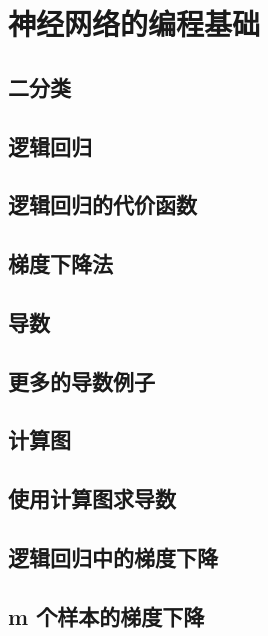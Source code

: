 \documentclass[../../main.tex]{subfiles}
\begin{document}
\chapter{神经网络的编程基础}
\section{二分类}

\section{逻辑回归}

\section{逻辑回归的代价函数}

\section{梯度下降法}

\section{导数}

\section{更多的导数例子}

\section{计算图}

\section{使用计算图求导数}

\section{逻辑回归中的梯度下降}

\section{m 个样本的梯度下降}
\end{document}

